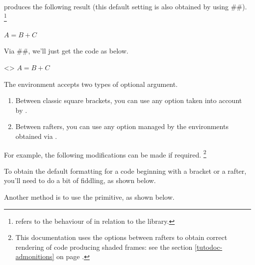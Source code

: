\begin{tdocexa}[Following]
     produces the following result (this default setting is also obtained by using \tdoclatexin##).%
    \footnote{
         refers to the  behaviour of  in relation to the  library.
    }

    \begin{tdoclatex}
$A = B + C$
    \end{tdoclatex}
\end{tdocexa}


\begin{tdocexa}
    Via \tdoclatexin##, we'll just get the code as below.

    \begin{tdoclatex}<>
$A = B + C$
    \end{tdoclatex}
\end{tdocexa}


\begin{tdocexa}[Customise]
	The  environment accepts two types of optional argument.
	\begin{enumerate}
		\item Between classic square brackets, you can use any option taken into account by .

		\item Between rafters, you can use any option managed by the environments obtained via .
	\end{enumerate}

	For example, the following modifications can be made if required.%
	\footnote{
		This documentation uses the options between rafters to obtain correct rendering of code producing shaded frames: see the section \ref{tutodoc-admonitions} on page \pageref{tutodoc-admonitions}.
	}

\end{tdocexa}

\medskip

\begin{tdocwarn}
    To obtain the default formatting for a code beginning with a bracket or a rafter, you'll need to do a bit of fiddling, as shown below.

    \smallskip

    Another method is to use the  primitive, as shown below.
\end{tdocwarn}


